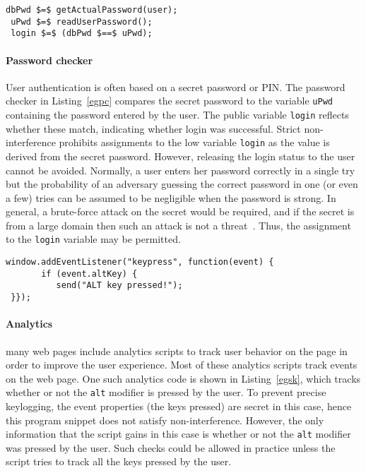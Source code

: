 \begin{lstlisting}[float,caption=Password Checker, label=egpc]
 dbPwd $=$ getActualPassword(user);
 uPwd $=$ readUserPassword();
 login $=$ (dbPwd $==$ uPwd);
\end{lstlisting}

\paragraph{Password checker}
User authentication is often based on a secret password or PIN.
The password checker in Listing~\ref{egpc} %
compares the secret password to the
variable \texttt{uPwd} containing the password entered by the
user. The public variable
\texttt{login} reflects whether these match,
indicating whether login was successful. Strict
non-interference prohibits assignments to the low
variable \texttt{login} as the value is derived from the
secret password. However, releasing the login
status to the user cannot be avoided. Normally, a user enters her password correctly
in a single try but the probability of an adversary guessing the
correct password in one (or even a few) tries can be
assumed to be negligible when the password is strong. In general, a
brute-force attack on the secret would be required, and if the secret
is from a large domain then such an attack is not a
threat~\cite{relSec}. Thus, the assignment to the \texttt{login}
variable may be permitted. %

\begin{lstlisting}[float,caption=Shortcut Key Usage,label=egsk]
window.addEventListener("keypress", function(event) {
       if (event.altKey) {
          send("ALT key pressed!");
 }});
\end{lstlisting}

\paragraph{Analytics}
many web pages include analytics scripts to track user behavior on
the page in order to improve the user
experience. Most of these analytics scripts track events
on the web page. One such analytics code is shown in
Listing~\ref{egsk}, which tracks whether or not the
\texttt{alt} modifier is pressed by the user. To prevent precise
keylogging, the event
properties (the keys pressed) are secret in this case, hence this
program snippet does not satisfy non-interference. However, the only
information that the script gains in this case is whether or not the
\texttt{alt} modifier was pressed by the user. Such checks could be
allowed in practice unless the script tries to track %
all the keys pressed by the user.

